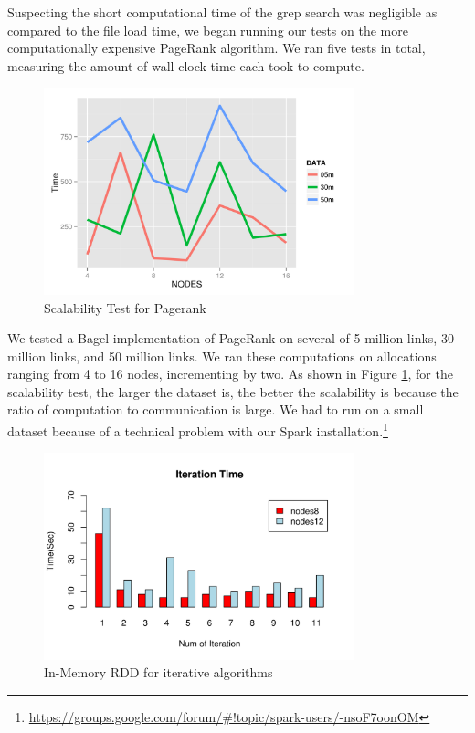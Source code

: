 \documentclass{article}
\begin{document}
Suspecting the short computational time of the grep search was negligible as
compared to the file load time, we began running our tests on the more
computationally expensive PageRank algorithm. We ran five tests in total,
measuring the amount of wall clock time each took to compute.

    \begin{figure}[H]
        \centering
        \includegraphics[width=90mm]{images/scalability.png}
        \caption{Scalability Test for Pagerank}
        \label{fig:scalability}
    \end{figure}


We tested a Bagel implementation of PageRank on several of 5 million links, 30
million links, and 50 million links. We ran these computations on allocations
ranging from 4 to 16 nodes, incrementing by two.  As shown in Figure
\ref{fig:scalability}, for the scalability test, the larger the dataset is, the
better the scalability is because the ratio of computation to communication is
large. We had to run on a small dataset because of a technical problem with our
Spark installation.\footnote{
\url{https://groups.google.com/forum/#!topic/spark-users/-nsoF7oonOM}}

\begin{figure}[H]
        \centering
        \includegraphics[width=90mm]{images/in-mem.png}
        \caption{In-Memory RDD for iterative algorithms}
        \label{fig:in-memory}
    \end{figure}
\end{document}
